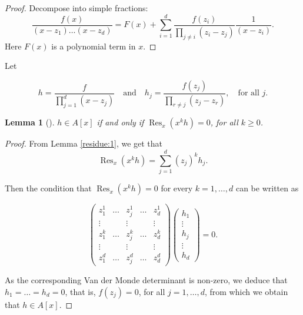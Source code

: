 \documentclass{article}
\newtheorem{lemma}[theorem]{Lemma}
\DeclareMathOperator{\Res}{Res}
\begin{document}
	\begin{proof}
		Decompose into simple fractions:
		\begin{equation*}
			\frac{f(x)}{(x - z_{1})\ldots(x - z_{d})} = F(x) + \sum\limits_{i = 1}^{d} \frac{f(z_{i})}{\prod_{j \neq i} (z_{i} - z_{j})} \frac{1}{(x - z_{i})}.
		\end{equation*}
		Here $F(x)$ is a polynomial term in $x$.
	\end{proof}
	
	Let
	
	\begin{equation*}
		h = \frac{f}{ \prod_{j = 1}^{d}(x - z_{j}) } \quad \text{and} \quad h_{j} = \frac{f(z_{j})}{\prod_{r \neq j}(z_{j} - z_{r})}, \quad \text{for all } j.
	\end{equation*}
	
	\begin{lemma}[\cite{Guillemin1999}]\label{residue:2}
		$h \in A[x]$ if and only if $\Res_{x}(x^{k}h) = 0$, for all $k \geq 0$.
	\end{lemma}
	
	\begin{proof}
		From Lemma \ref{residue:1}, we get that
		\begin{equation*}
			\Res_{x}(x^{k}h) = \sum_{j = 1}^{d} (z_{j})^{k} h_{j}.
		\end{equation*}
		
		Then the condition that $\Res_{x}(x^{k}h) = 0$ for every $k = 1, \ldots, d$ can be written as
		
		\begin{equation*}
			\begin{pmatrix}
				z_{1}^{1} & \ldots & z_{j}^{1} & \ldots & z_{d}^{1} \\
				\vdots & & \vdots & & \vdots \\
				z_{1}^{k} & \ldots & z_{j}^{k} & \ldots & z_{d}^{k} \\
				\vdots & & \vdots & & \vdots \\
				z_{1}^{d} & \ldots & z_{j}^{d} & \ldots & z_{d}^{d}
			\end{pmatrix}
			\begin{pmatrix}
				h_{1} \\ \vdots \\ h_{j} \\ \vdots \\ h_{d}
			\end{pmatrix}
			= 0.
		\end{equation*}
	
		As the corresponding Van der Monde determinant is non-zero, we deduce that $h_{1} = \ldots = h_{d} = 0$, that is, $f(z_{j}) = 0$, for all $j = 1, \ldots, d$, from which we obtain that $h \in A[x]$.
	\end{proof}
	
\end{document}
